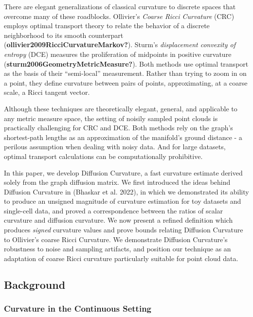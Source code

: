 \documentclass[
  letterpaper,
  DIV=11,
  numbers=noendperiod]{scrartcl}
\begin{document}
There are elegant generalizations of classical curvature to discrete
spaces that overcome many of these roadblocks. Ollivier's \emph{Coarse
Ricci Curvature} (CRC) employs optimal transport theory to relate the
behavior of a discrete neighborhood to its smooth counterpart
(\textbf{ollivier2009RicciCurvatureMarkov?}). Sturm's \emph{displacement
convexity of entropy} (DCE) measures the proliferation of midpoints in
positive curvature (\textbf{sturm2006GeometryMetricMeasure?}). Both
methods use optimal transport as the basis of their ``semi-local''
measurement. Rather than trying to zoom in on a point, they define
curvature between pairs of points, approximating, at a coarse scale, a
Ricci tangent vector.

Although these techniques are theoretically elegant, general, and
applicable to any metric measure space, the setting of noisily sampled
point clouds is practically challenging for CRC and DCE. Both methods
rely on the graph's shortest-path lengths as an approximation of the
manifold's ground distance - a perilous assumption when dealing with
noisy data. And for large datasets, optimal transport calculations can
be computationally prohibitive.

In this paper, we develop Diffusion Curvature, a fast curvature estimate
derived solely from the graph diffusion matrix. We first introduced the
ideas behind Diffusion Curvature in (Bhaskar et al. 2022), in which we
demonstrated its ability to produce an unsigned magnitude of curvature
estimation for toy datasets and single-cell data, and proved a
correspondence between the ratios of scalar curvature and diffusion
curvature. We now present a refined definition which produces
\emph{signed} curvature values and prove bounds relating Diffusion
Curvature to Ollivier's coarse Ricci Curvature. We demonstrate Diffusion
Curvature's robustness to noise and sampling artifacts, and position our
technique as an adaptation of coarse Ricci curvature particularly
suitable for point cloud data.

\subsection{Background}\label{background}

\subsubsection{Curvature in the Continuous
Setting}\label{curvature-in-the-continuous-setting}
\end{document}
